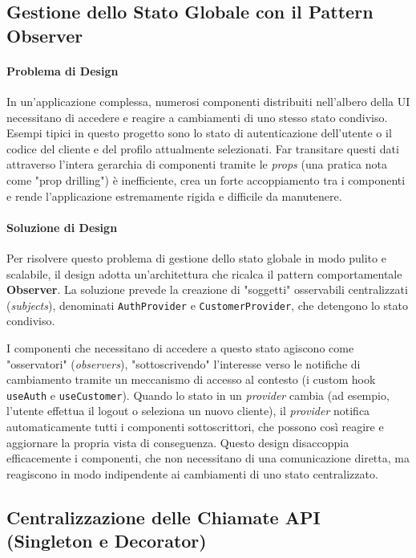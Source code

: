 \documentclass[12pt,a4paper,openright,twoside]{book}
\begin{document}
\subsection{Gestione dello Stato Globale con il Pattern Observer}
\label{subsec:design_observer_frontend}

\paragraph{Problema di Design}
In un'applicazione complessa, numerosi componenti distribuiti nell'albero della UI necessitano di accedere e reagire a cambiamenti di uno stesso stato condiviso. Esempi tipici in questo progetto sono lo stato di autenticazione dell'utente o il codice del cliente e del profilo attualmente selezionati. Far transitare questi dati attraverso l'intera gerarchia di componenti tramite le \textit{props} (una pratica nota come "prop drilling") è inefficiente, crea un forte accoppiamento tra i componenti e rende l'applicazione estremamente rigida e difficile da manutenere.

\paragraph{Soluzione di Design}
Per risolvere questo problema di gestione dello stato globale in modo pulito e scalabile, il design adotta un'architettura che ricalca il pattern comportamentale \textbf{Observer}. La soluzione prevede la creazione di "soggetti" osservabili centralizzati (\textit{subjects}), denominati \texttt{AuthProvider} e \texttt{CustomerProvider}, che detengono lo stato condiviso.

I componenti che necessitano di accedere a questo stato agiscono come "osservatori" (\textit{observers}), "sottoscrivendo" l'interesse verso le notifiche di cambiamento tramite un meccanismo di accesso al contesto (i custom hook \texttt{useAuth} e \texttt{useCustomer}). Quando lo stato in un \textit{provider} cambia (ad esempio, l'utente effettua il logout o seleziona un nuovo cliente), il \textit{provider} notifica automaticamente tutti i componenti sottoscrittori, che possono così reagire e aggiornare la propria vista di conseguenza. Questo design disaccoppia efficacemente i componenti, che non necessitano di una comunicazione diretta, ma reagiscono in modo indipendente ai cambiamenti di uno stato centralizzato.

\subsection{Centralizzazione delle Chiamate API (Singleton e Decorator)}
\label{subsec:design_api_singleton_decorator}
\end{document}
